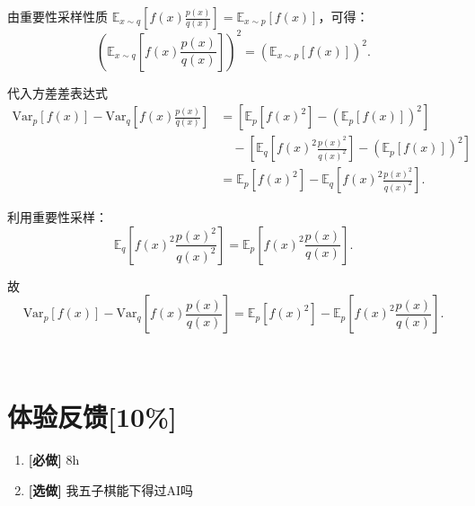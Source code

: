 \documentclass{article}
\begin{document}
\begin{enumerate}[label=(\alph*), start=1]
    由重要性采样性质 \(\mathbb{E}_{x \sim q}\left[f(x)\frac{p(x)}{q(x)}\right] = \mathbb{E}_{x \sim p}[f(x)]\)，可得：
    \[
    \left(\mathbb{E}_{x \sim q}\left[f(x)\frac{p(x)}{q(x)}\right]\right)^2 = \left(\mathbb{E}_{x \sim p}[f(x)]\right)^2.
    \]
    
    代入方差差表达式
    \[
    \begin{aligned}
    \text{Var}_{p}[f(x)] - \text{Var}_{q}\left[f(x)\frac{p(x)}{q(x)}\right] &= \left[\mathbb{E}_{p}[f(x)^2] - \left(\mathbb{E}_{p}[f(x)]\right)^2\right] \\
    &\quad - \left[\mathbb{E}_{q}\left[f(x)^2\frac{p(x)^2}{q(x)^2}\right] - \left(\mathbb{E}_{p}[f(x)]\right)^2\right] \\
    &= \mathbb{E}_{p}[f(x)^2] - \mathbb{E}_{q}\left[f(x)^2\frac{p(x)^2}{q(x)^2}\right].
    \end{aligned}
    \]
    
    利用重要性采样：
    \[
    \mathbb{E}_{q}\left[f(x)^2\frac{p(x)^2}{q(x)^2}\right] = \mathbb{E}_{p}\left[f(x)^2\frac{p(x)}{q(x)}\right].
    \]
    
    故\[
    \text{Var}_{p}[f(x)] - \text{Var}_{q}\left[f(x)\frac{p(x)}{q(x)}\right] = \mathbb{E}_{p}[f(x)^2] - \mathbb{E}_{p}\left[f(x)^2\frac{p(x)}{q(x)}\right].
    \]
    
\end{enumerate}
\

\section*{体验反馈[10\%]}

\begin{enumerate}[label=(\alph*), start=1]
    \item \textbf{[必做]} %
    8h
    \item \textbf{[选做]} %
    我五子棋能下得过AI吗
\end{enumerate}
\end{document}
